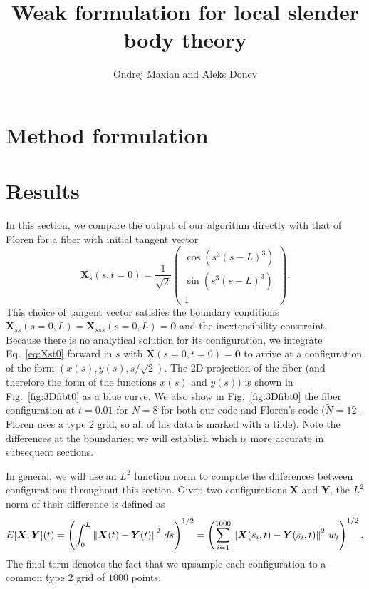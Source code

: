 \documentclass{article}
\title{Weak formulation for local slender body theory}
\author{Ondrej Maxian and Aleks Donev}
\begin{document}
\maketitle
\section{Method formulation}


\newpage
\section{Results}
In this section, we compare the output of our algorithm directly with that of Floren for a fiber with initial tangent vector
\begin{equation}
\label{eq:Xst0}
\bm{X}_s(s,t=0) = \frac{1}{\sqrt{2}}\begin{pmatrix} \cos{\left(s^3 (s-L)^3\right)}\\[2 pt] \sin{\left(s^3(s-L)^3\right)}\\[2 pt] 1 \end{pmatrix}. 
\end{equation}
This choice of tangent vector satisfies the boundary conditions $\displaystyle \bm{X}_{ss}\left(s=0,L\right)=\bm{X}_{sss}\left(s=0,L\right)=\bm{0}$ and the inextensibility constraint. Because there is no analytical solution for its configuration, we integrate Eq.\ \eqref{eq:Xst0} forward in $s$ with $\bm{X}(s=0,t=0)=\bm{0}$ to arrive at a configuration of the form $(x(s),y(s),s/\sqrt{2})$. The 2D projection of the fiber (and therefore the form of the functions $x(s)$ and $y(s)$) is shown in Fig.\ \ref{fig:3Dfibt0} as a blue curve. We also show in Fig.\ \ref{fig:3Dfibt0} the fiber configuration at $t=0.01$ for $N=8$ for both our code and Floren's code ($\tilde{N}=12$ - Floren uses a type 2 grid, so all of his data is marked with a tilde). Note the differences at the boundaries; we will establish which is more accurate in subsequent sections. 

In general, we will use an $L^2$ function norm to compute the differences between configurations throughout this section. Given two configurations $\bm{X}$ and $\bm{Y}$, the $L^2$ norm of their difference is defined as
\begin{equation}
\label{eq:Errort}
E[\boldsymbol{X},\boldsymbol{Y}](t) = \left(\int_0^L \left\Vert \boldsymbol{X}(t)-\boldsymbol{Y}(t)\right\Vert^2 \, ds\right)^{1/2} = \left( \sum_{i=1}^{1000} \left\Vert \boldsymbol{X}(s_i,t)-\boldsymbol{Y}(s_i,t)\right\Vert^2 \, w_i  \right)^{1/2}. 
\end{equation}
The final term denotes the fact that we upsample each configuration to a common type 2 grid of $1000$ points. 
\end{document}
